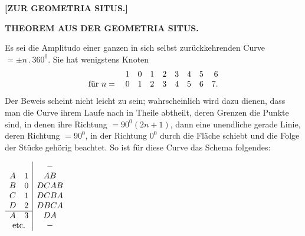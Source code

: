 \begin{center}
{\Large\bfseries{}}\par\medskip
[I.]

\bigskip \textbf{[ZUR GEOMETRIA SITUS.]}

\bigskip [1.]

\medskip \textbf{THEOREM AUS DER GEOMETRIA SITUS.}
\end{center}

Es sei die Amplitudo einer ganzen in sich selbst zurückkehrenden Curve
$=\pm n\,.\,360^0$. Sie hat wenigstens Knoten
\[
\begin{array}{r@{\quad}rrrrrrrr}
&1&0&1&2&3&4&5&6\\
\text{für }n={}&0&1&2&3&4&5&6&7.
\end{array}
\]
Der Beweis scheint nicht leicht zu sein; wahrscheinlich wird dazu dienen, dass man die Curve ihrem Laufe nach in Theile abtheilt, deren Grenzen die Punkte sind, in denen ihre Richtung $=90^0(2n+1)$, dann eine unendliche gerade Linie, deren Richtung $=90^0$, in der Richtung $0^0$ durch die Fläche schiebt und die Folge der Stücke gehörig beachtet. So ist für diese Curve das Schema folgendes:

\begin{center}
\begin{minipage}{8cm}\centering

\end{minipage}\hfill
\begin{minipage}{3.8cm}\centering
$\begin{array}{cc|c}
&&-\\
A&1&AB\\
B&0&DCAB\\
C&1&DCBA\\
D&2&DBCA\\ \cline{1-2}
A&3&DA\\
\multicolumn{2}{c|}{\text{etc.}}&-
\end{array}$
\end{minipage}
\end{center}

